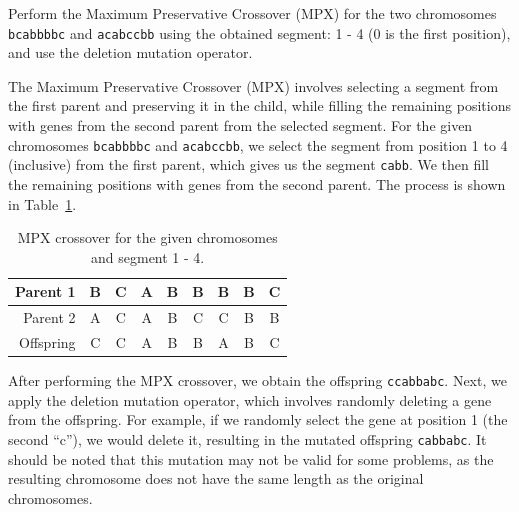\begin{ejercicio}
    Perform the Maximum Preservative Crossover (MPX) for the two chromosomes \texttt{bcabbbbc} and \texttt{acabccbb} using the obtained segment: 1 - 4 (0 is the first position), and use the deletion mutation operator.
    
    The Maximum Preservative Crossover (MPX) involves selecting a segment from the first parent and preserving it in the child, while filling the remaining positions with genes from the second parent from the selected segment. For the given chromosomes \texttt{bcabbbbc} and \texttt{acabccbb}, we select the segment from position 1 to 4 (inclusive) from the first parent, which gives us the segment \texttt{cabb}. We then fill the remaining positions with genes from the second parent. The process is shown in Table~\ref{tab:mpx}.
    \begin{table}[ht]
        \centering
        \begin{tabular}{r|c|cccc|ccc}
            Parent 1 & B & C & A & B & B & B & B & C \\ \hline
            Parent 2 & A & C & A & B & C & C & B & B \\ \hline 
            Offspring & C & C & A & B & B & A & B & C
        \end{tabular}
        \caption{\centering MPX crossover for the given chromosomes and segment 1 - 4.}
        \label{tab:mpx}
    \end{table}

    After performing the MPX crossover, we obtain the offspring \texttt{ccabbabc}. Next, we apply the deletion mutation operator, which involves randomly deleting a gene from the offspring. For example, if we randomly select the gene at position 1 (the second ``c''), we would delete it, resulting in the mutated offspring \texttt{cabbabc}. It should be noted that this mutation may not be valid for some problems, as the resulting chromosome does not have the same length as the original chromosomes.
\end{ejercicio}